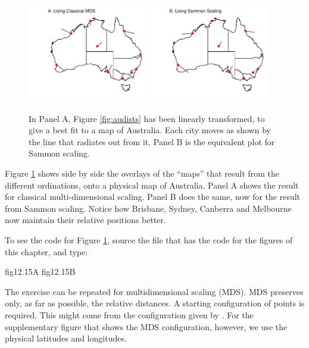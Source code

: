 \begin{figure}[h]
\begin{Schunk}


\centerline{\includegraphics[width=0.47\textwidth]{figs/9-au-both-1} \includegraphics[width=0.47\textwidth]{figs/9-au-both-2} }

\end{Schunk}
      \caption{In Panel A, Figure \ref{fig:audists} has been linearly
        transformed, to give a best fit to a map of Australia.  Each city
        moves as shown by the line that radiates out from it.  Panel B
        is the equivalent plot for Sammon scaling.
\label{fig:aufit}}
 \end{figure}
 Figure \ref{fig:aufit} shows side by side the overlays of the
 ``maps'' that result from the different ordinations, onto a physical
 map of Australia.  Panel A shows the result for classical
 multi-dimensional scaling.  Panel B does the same, now for the result
 from Sammon scaling.  Notice how Brisbane, Sydney, Canberra and
 Melbourne now maintain their relative positions better.

To see the code for Figure \ref{fig:aufit}, source the file that has the
code for the figures of this chapter, and type:
\begin{Schunk}
\begin{Sinput}
fig12.15A
fig12.15B
\end{Sinput}
\end{Schunk}

The exercise can be repeated for multidimensional scaling (MDS). MDS
preserves only, as far as possible, the relative distances.  A
starting configuration of points is required.  This might come from
the configuration given by .  For the supplementary
figure  that shows the MDS configuration, however, we
use the physical latitudes and longitudes.

